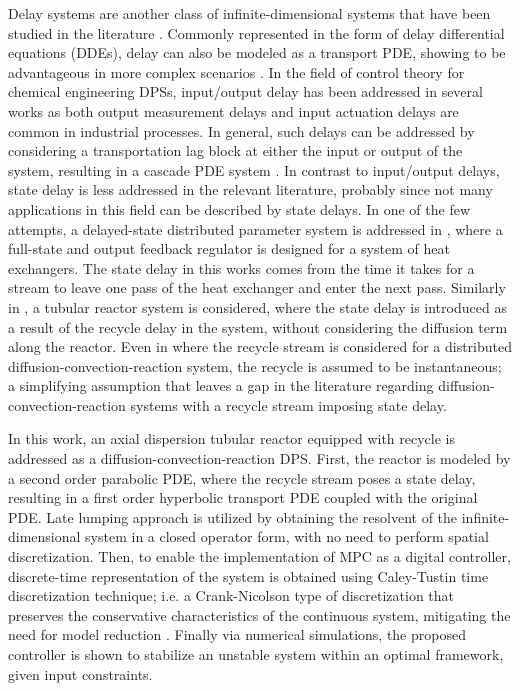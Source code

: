 Delay systems are another class of infinite-dimensional systems that have been studied in the literature \cite{curtainbook}. 
Commonly represented in the form of delay differential equations (DDEs), delay can also be modeled as a transport PDE, showing to be advantageous in more complex scenarios \cite{krstic2009book}. In the field of control theory for chemical engineering DPSs, input/output delay has been addressed in several works as both output measurement delays and input actuation delays are common in industrial processes. 
In general, such delays can be addressed by considering a transportation lag block at either the input or output of the system, resulting in a cascade PDE system \cite{Hiratsuka1969IEEE, mohammadi2012lq, Guilherme2019ACC}. In contrast to input/output delays, state delay is less addressed in the relevant literature, probably since not many applications in this field can be described by state delays. In one of the few attempts, a delayed-state distributed parameter system is addressed in \cite{ozorio2019heat}, where a full-state and output feedback regulator is designed for a system of heat exchangers. The state delay in this works comes from the time it takes for a stream to leave one pass of the heat exchanger and enter the next pass. Similarly in \cite{qi2021output}, a tubular reactor system is considered, where the state delay is introduced as a result of the recycle delay in the system, without considering the diffusion term along the reactor. Even in \cite{khatibi2021model} where the recycle stream is considered for a distributed diffusion-convection-reaction system, the recycle is assumed to be instantaneous; a simplifying assumption that leaves a gap in the literature regarding diffusion-convection-reaction systems with a recycle stream imposing state delay.

In this work, an axial dispersion tubular reactor equipped with recycle is addressed as a diffusion-convection-reaction DPS. First, the reactor is modeled by a second order parabolic PDE, where the recycle stream poses a state delay, resulting in a first order hyperbolic transport PDE coupled with the original PDE. Late lumping approach is utilized by obtaining the resolvent of the infinite-dimensional system in a closed operator form, with no need to perform spatial discretization. Then, to enable the implementation of MPC as a digital controller, discrete-time representation of the system is obtained using Caley-Tustin time discretization technique; i.e. a Crank-Nicolson type of discretization that preserves the conservative characteristics of the continuous system, mitigating the need for model reduction \cite{havu2007cayley, xu2017linear}. Finally via numerical simulations, the proposed controller is shown to stabilize an unstable system within an optimal framework, given input constraints.
